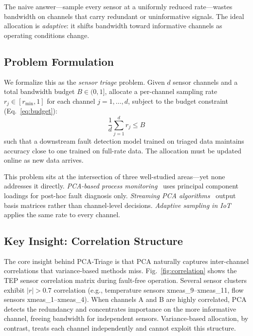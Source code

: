 \documentclass[journal]{IEEEtran}
\begin{document}
The naive answer---sample every sensor at a uniformly reduced rate---wastes bandwidth on channels that carry redundant or uninformative signals. The ideal allocation is \textit{adaptive}: it shifts bandwidth toward informative channels as operating conditions change.

\subsection{Problem Formulation}

We formalize this as the \textit{sensor triage} problem. Given $d$ sensor channels and a total bandwidth budget $B \in (0, 1]$, allocate a per-channel sampling rate $r_j \in [r_{\min}, 1]$ for each channel $j = 1, \ldots, d$, subject to the budget constraint (Eq.~\ref{eq:budget}):
\begin{equation}
\frac{1}{d} \sum_{j=1}^{d} r_j \leq B
\label{eq:budget}
\end{equation}
such that a downstream fault detection model trained on triaged data maintains accuracy close to one trained on full-rate data. The allocation must be updated online as new data arrives.

This problem sits at the intersection of three well-studied areas---yet none addresses it directly. \textit{PCA-based process monitoring}~\cite{chen2013pca, processmonitoring2024survey, downs1993tep} uses principal component loadings for post-hoc fault diagnosis only. \textit{Streaming PCA algorithms}~\cite{weng2003ccipca, balzano2010grouse, yang2018historypca} output basis matrices rather than channel-level decisions. \textit{Adaptive sampling in IoT}~\cite{benaboud2021adaptive, giordano2023energy} applies the same rate to every channel.

\subsection{Key Insight: Correlation Structure}

The core insight behind PCA-Triage is that PCA naturally captures inter-channel correlations that variance-based methods miss. Fig.~\ref{fig:correlation} shows the TEP sensor correlation matrix during fault-free operation. Several sensor clusters exhibit $|r| > 0.7$ correlation (e.g., temperature sensors xmeas\_9--xmeas\_11, flow sensors xmeas\_1--xmeas\_4). When channels A and B are highly correlated, PCA detects the redundancy and concentrates importance on the more informative channel, freeing bandwidth for independent sensors. Variance-based allocation, by contrast, treats each channel independently and cannot exploit this structure.
\end{document}

